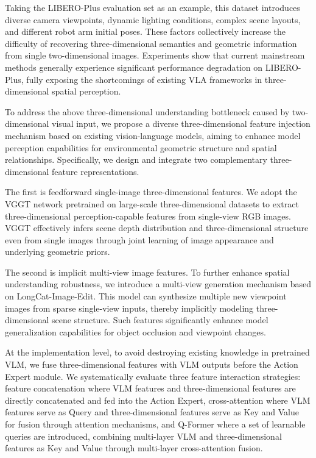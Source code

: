 \documentclass[11pt,a4paper]{article}
\begin{document}
Taking the LIBERO-Plus evaluation set as an example, this dataset introduces diverse camera viewpoints, dynamic lighting conditions, complex scene layouts, and different robot arm initial poses. These factors collectively increase the difficulty of recovering three-dimensional semantics and geometric information from single two-dimensional images. Experiments show that current mainstream methods generally experience significant performance degradation on LIBERO-Plus, fully exposing the shortcomings of existing VLA frameworks in three-dimensional spatial perception.

To address the above three-dimensional understanding bottleneck caused by two-dimensional visual input, we propose a diverse three-dimensional feature injection mechanism based on existing vision-language models, aiming to enhance model perception capabilities for environmental geometric structure and spatial relationships. Specifically, we design and integrate two complementary three-dimensional feature representations.

The first is feedforward single-image three-dimensional features. We adopt the VGGT network pretrained on large-scale three-dimensional datasets to extract three-dimensional perception-capable features from single-view RGB images. VGGT effectively infers scene depth distribution and three-dimensional structure even from single images through joint learning of image appearance and underlying geometric priors.

The second is implicit multi-view image features. To further enhance spatial understanding robustness, we introduce a multi-view generation mechanism based on LongCat-Image-Edit. This model can synthesize multiple new viewpoint images from sparse single-view inputs, thereby implicitly modeling three-dimensional scene structure. Such features significantly enhance model generalization capabilities for object occlusion and viewpoint changes.

At the implementation level, to avoid destroying existing knowledge in pretrained VLM, we fuse three-dimensional features with VLM outputs before the Action Expert module. We systematically evaluate three feature interaction strategies: feature concatenation where VLM features and three-dimensional features are directly concatenated and fed into the Action Expert, cross-attention where VLM features serve as Query and three-dimensional features serve as Key and Value for fusion through attention mechanisms, and Q-Former where a set of learnable queries are introduced, combining multi-layer VLM and three-dimensional features as Key and Value through multi-layer cross-attention fusion.
\end{document}
